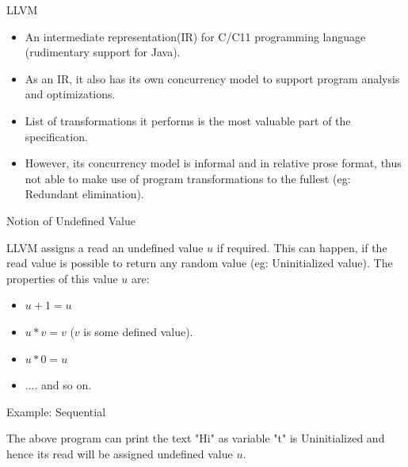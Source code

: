 \documentclass[xcolor=dvipsnames, notes]{beamer}
\begin{document}
    \begin{frame}{LLVM}

        \begin{itemize}
            \item An intermediate representation(IR) for C/C11 programming language (rudimentary support for Java).
            \item As an IR, it also has its own concurrency model to support program analysis and optimizations.
            \item List of transformations it performs is the most valuable part of the specification.
            \item However, its concurrency model is informal and in relative prose format, thus not able to make use of program transformations to the fullest (eg: Redundant elimination). 
        \end{itemize}

    \end{frame}

    \begin{frame}{Notion of Undefined Value}

        LLVM assigns a read an undefined value $u$ if required.
        This can happen, if the read value is possible to return any random value (eg: Uninitialized value).
        The properties of this value $u$ are:
        \begin{itemize}
            \item $u+1=u$
            \item $u*v=v$ ($v$ is some defined value).
            \item $u*0=u$
            \item .... and so on.
        \end{itemize}
        
    \end{frame}

    \begin{frame}{Example: Sequential}

        \begin{figure}
        \end{figure}

        The above program can print the text "Hi" as variable "t" is Uninitialized and hence its read will be assigned undefined value $u$.

    \end{frame}
\end{document}
